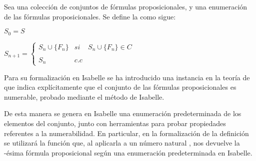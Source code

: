 \begin{isabellebody}
\begin{isamarkuptext}
\begin{definicion}
  Sea  una colección de conjuntos de fórmulas proposicionales,  y  una 
  enumeración de las fórmulas proposicionales. Se define la  como sigue:

  $S_{0} = S$

  $S_{n+1} = \left\{ \begin{array}{lcc} S_{n} \cup \{F_{n}\} &  si  & S_{n} \cup \{F_{n}\} \in C \\ \\ S_{n} & c.c \end{array} \right.$ 
\end{definicion}

  Para su formalización en Isabelle se ha introducido una instancia en la teoría de  que 
  indica explícitamente que el conjunto de las fórmulas proposicionales es numerable, probado
  mediante el método  de Isabelle.


  De esta manera se genera en Isabelle una enumeración predeterminada de los elementos del conjunto,
  junto con herramientas para probar propiedades referentes a la numerabilidad. En particular, en la 
  formalización de la definición  se utilizará la función  que, al aplicarla a un 
  número natural , nos devuelve la -ésima fórmula proposicional según una enumeración 
  predeterminada en Isabelle. 


\end{isamarkuptext}
\end{isabellebody}
